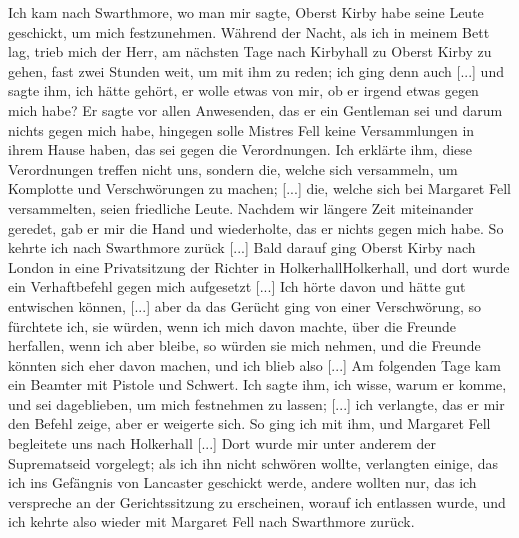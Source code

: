 Ich kam nach Swarthmore, wo man mir sagte, Oberst Kirby
habe seine Leute geschickt, um mich festzunehmen. Während der
Nacht, als ich in meinem Bett lag, trieb mich der Herr, am
nächsten Tage nach Kirbyhall zu Oberst 
Kirby zu gehen, fast zwei
Stunden weit, um mit ihm zu reden; ich ging denn auch [...]
und sagte ihm, ich hätte gehört, er wolle etwas von mir, ob er
irgend etwas gegen mich habe? Er sagte vor allen Anwesenden,
das er ein Gentleman sei und darum nichts gegen mich habe,
hingegen solle Mistres Fell keine Versammlungen in ihrem Hause
haben, das sei gegen die Verordnungen. Ich erklärte ihm, diese
Verordnungen treffen nicht uns, sondern die, welche sich 
versammeln, um Komplotte und Verschwörungen zu machen; [...]
die, welche sich bei Margaret Fell versammelten, seien friedliche
Leute. Nachdem wir längere Zeit miteinander geredet, gab er
mir die Hand und wiederholte, das er nichts gegen mich habe.
So kehrte ich nach Swarthmore zurück [...] Bald darauf
ging Oberst Kirby nach London in eine Privatsitzung der Richter
in Holkerhall\indexname{Holkerhall}, und dort wurde ein 
Verhaftbefehl gegen mich aufgesetzt [...] Ich hörte davon 
und hätte gut entwischen können, [...]
aber da das Gerücht ging von einer Verschwörung, so fürchtete
ich, sie würden, wenn ich mich davon machte, über die Freunde
herfallen, wenn ich aber bleibe, so würden sie mich nehmen, und
die Freunde könnten sich eher davon machen, und ich blieb also [...]
Am folgenden Tage kam ein Beamter mit Pistole und Schwert.
Ich sagte ihm, ich wisse, warum er komme, und sei dageblieben,
um mich festnehmen zu lassen; [...] ich verlangte, das er mir den
Befehl zeige, aber er weigerte sich. So ging ich mit ihm, und
Margaret Fell begleitete uns nach 
Holkerhall [...] Dort wurde
mir unter anderem der Suprematseid vorgelegt; als ich ihn nicht
schwören wollte, verlangten einige, das ich ins Gefängnis von
Lancaster geschickt werde, andere wollten nur, das ich verspreche
an der Gerichtssitzung zu erscheinen, worauf ich entlassen wurde,
und ich kehrte also wieder mit Margaret Fell nach Swarthmore
zurück.

